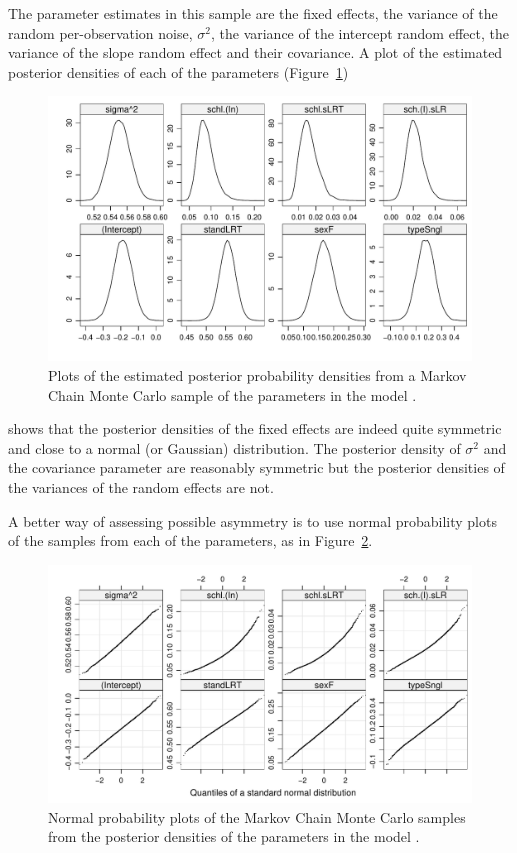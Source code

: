 \documentclass[12pt]{article}
\begin{document}
The parameter estimates in this sample are the fixed effects, the
variance of the random per-observation noise, $\sigma^2$, the variance
of the intercept random effect, the variance of the slope random
effect and their covariance.  A plot of the estimated posterior
densities of each of the parameters (Figure~\ref{fig:Examplot7})
\begin{figure}[tbp]
  \centering
  \includegraphics[width=\textwidth]{figs/SoftRev-Examplot7}
  \caption{Plots of the estimated posterior probability densities from
    a Markov Chain Monte Carlo sample of the parameters in the model
    .} 
  \label{fig:Examplot7}
\end{figure}
shows that the posterior densities of the fixed effects are indeed
quite symmetric and close to a normal (or Gaussian) distribution.  The
posterior density of $\sigma^2$ and the covariance parameter are
reasonably symmetric but the posterior densities of the variances of
the random effects are not.

A better way of assessing possible asymmetry is to use normal
probability plots of the samples from each of the parameters, as in
Figure~\ref{fig:Examplot8}.
\begin{figure}[tbp]
  \centering
  \includegraphics[width=\textwidth]{figs/SoftRev-Examplot8}
  \caption{Normal probability plots of the Markov Chain Monte Carlo
    samples from the posterior densities of the parameters in the
    model .} 
  \label{fig:Examplot8}
\end{figure}
\end{document}

